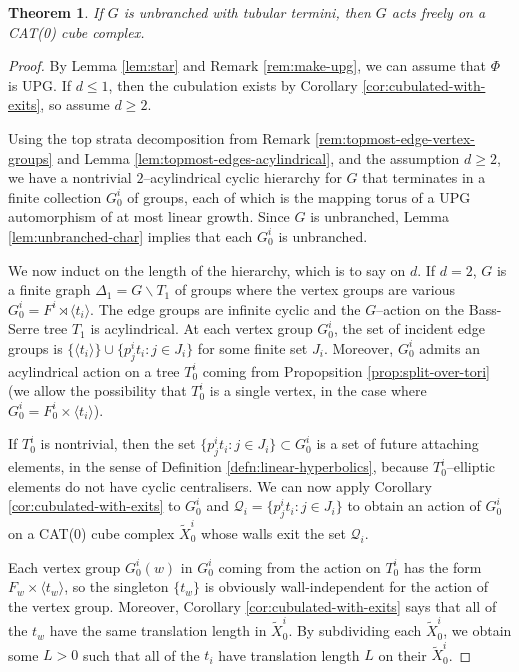 \documentclass[11pt,oneside]{amsart}
\newtheorem{thm}{Theorem}[section]
\theoremstyle{definition}
\begin{document}
\begin{thm}\label{thm:main}
If $G$ is unbranched with tubular termini, then $G$ acts freely on a CAT(0) cube complex.
\end{thm}

\begin{proof}
By Lemma \ref{lem:star} and Remark \ref{rem:make-upg}, we can assume that $\Phi$ is UPG.  If $d\leq 1$, then the cubulation exists by Corollary \ref{cor:cubulated-with-exits}, so assume $d\geq 2$.

Using the top strata decomposition from Remark \ref{rem:topmost-edge-vertex-groups} and Lemma \ref{lem:topmost-edges-acylindrical}, and the assumption $d\geq 2$, we have a nontrivial $2$--acylindrical cyclic hierarchy for $G$ that terminates in a finite collection $G^i_0$ of groups, each of which is the mapping torus of a UPG automorphism of at most linear growth.  Since $G$ is unbranched, Lemma \ref{lem:unbranched-char} implies that each $G_0^i$ is unbranched.

We now induct on the length of the hierarchy, which is to say on $d$.  If $d=2$, $G$ is a finite graph $\Delta_1=G\backslash T_1$ of groups where the vertex groups are various $G_0^i=F^i\rtimes\langle t_i\rangle$.  The edge groups are infinite cyclic and the $G$--action on the Bass-Serre tree $T_1$ is acylindrical.  At each vertex group $G^i_0$, the set of incident edge groups is $\{\langle t_i\rangle\}\cup \{p^i_jt_i:j\in J_i\}$ for some finite set $J_i$.  Moreover, $G_0^i$ admits an acylindrical action on a tree $T_0^i$ coming from Propopsition \ref{prop:split-over-tori} (we allow the possibility that $T_0^i$ is a single vertex, in the case where $G_0^i=F_0^i\times \langle t_i\rangle$). 

If $T_0^i$ is nontrivial, then the set $ \{p^i_jt_i:j\in J_i\}\subset G_0^i$ is a set of  future attaching elements, in the sense of Definition \ref{defn:linear-hyperbolics}, because $T_0^i$--elliptic elements do not have cyclic centralisers.  We can now apply Corollary \ref{cor:cubulated-with-exits} to $G_0^i$ and $\mathcal Q_i= \{p^i_jt_i:j\in J_i\}$ to obtain an action of $G_0^i$ on a CAT(0) cube complex $\widetilde X_0^i$ whose walls exit the set $\mathcal Q_i$.

Each vertex group $G_0^i(w)$ in $G_0^i$ coming from the action on $T_0^i$ has the form $F_w\times \langle t_w\rangle$, so the singleton $\{t_w\}$ is obviously wall-independent for the action of the vertex group.  Moreover, Corollary \ref{cor:cubulated-with-exits} says that all of the $t_w$ have the same translation length in $\widetilde X_0^i$.  By subdividing each $\widetilde X_0^i$, we obtain some $L>0$ such that all of the $t_i$ have translation length $L$ on their $\widetilde X_0^i$.  


\end{proof}
\end{document}
